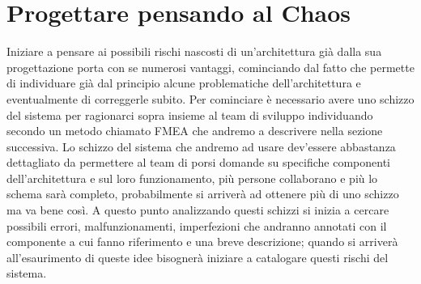 \section{Progettare pensando al Chaos}
Iniziare a pensare ai possibili rischi nascosti di un'architettura già dalla sua progettazione porta con se numerosi vantaggi, cominciando dal fatto che permette di individuare già dal principio alcune problematiche dell'architettura e eventualmente di correggerle subito.
Per cominciare è necessario avere uno schizzo del sistema per ragionarci sopra insieme al team di sviluppo individuando secondo un metodo chiamato FMEA che andremo a descrivere nella sezione successiva.
Lo schizzo del sistema che andremo ad usare dev'essere abbastanza dettagliato da permettere al team di porsi domande su specifiche componenti dell'architettura e sul loro funzionamento, più persone collaborano e più lo schema sarà completo, probabilmente si arriverà ad ottenere più di uno schizzo ma va bene così.
A questo punto analizzando questi schizzi si inizia a cercare possibili errori, malfunzionamenti, imperfezioni che andranno annotati con il componente a cui fanno riferimento e una breve descrizione; quando si arriverà all'esaurimento di queste idee bisognerà iniziare a catalogare questi rischi del sistema.

